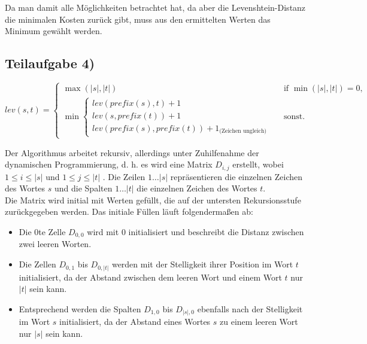 \documentclass[a4paper, fontsize=10pt]{scrartcl}
\begin{document}
\bigskip

Da man damit alle Möglichkeiten betrachtet hat, da aber die Levenshtein-Distanz die minimalen Kosten zurück gibt, muss aus den ermittelten Werten das Minimum gewählt werden.

\newpage
\subsection*{Teilaufgabe 4)}

$lev(s,t) = \begin{cases}

\max(|s|,|t|) &\textrm{if $\min(|s|,|t|)=0$},\\
    \min \begin{cases}
        lev(prefix(s),t)+1 & \\
        lev(s,prefix(t))+1 & \\
        lev(prefix(s),prefix(t)) + 1_{\textrm{(Zeichen ungleich)}}
        
        \end{cases} & \textrm{sonst.}
        
  \end{cases}      $\bigskip

Der Algorithmus arbeitet rekursiv, allerdings unter Zuhilfenahme der dynamischen Programmierung, d. h. es wird eine Matrix $D_{i,j}$ erstellt, wobei 
$1\leq i\leq |s|$ und $1\leq j \leq |t|$ . Die Zeilen $1\dots |s|$ repräsentieren die einzelnen Zeichen des Wortes $s$ und die Spalten $1\dots |t|$ die einzelnen Zeichen des Wortes $t$. \\

Die Matrix wird initial mit Werten gefüllt, die auf der untersten Rekursionsstufe zurückgegeben werden. Das initiale Füllen läuft folgendermaßen ab:

\begin{itemize}
  \item Die 0te Zelle  $D_{0,0}$ wird mit $0$ initialisiert und beschreibt die Distanz zwischen zwei leeren Worten. 
  \item Die Zellen $D_{0,1}$ bis $D_{0,|t|}$ werden mit der Stelligkeit ihrer Position im Wort $t$ initialisiert, da der Abstand zwischen dem leeren Wort und einem Wort $t$ nur $|t|$ sein kann.
  \item Entsprechend werden die Spalten $D_{1,0}$ bis $D_{|s|,0}$ ebenfalls nach der Stelligkeit im Wort $s$ initialisiert, da der Abstand eines Wortes $s$ zu einem leeren Wort nur $|s|$ sein kann.
\end{itemize}
\end{document}
